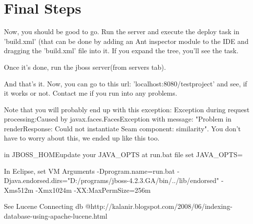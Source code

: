 \section{Final Steps}
Now, you should be good to go. Run the server and execute the deploy task in 'build.xml' (that can be done by adding an Ant inspector module to the IDE and dragging the 'build.xml' file into it. If you expand the tree, you'll see the task.

Once it's done, run the jboss server(from servers tab).

And that's it. Now, you can go to this url: 'localhost:8080/testproject' and see, if it works or not. Contact me if you run into any problems.

Note that you will probably end up with this exception: Exception during request processing:Caused by javax.faces.FacesException with message: "Problem in renderResponse: Could not instantiate Seam component: similarity". You don't have to worry about this, we ended up like this too.


in JBOSS_HOME\bin update your JAVA_OPTS at run.bat file
set JAVA_OPTS=%

In Eclipse, set VM Arguments
-Dprogram.name=run.bat -Djava.endorsed.dirs="D:/programs/jboss-4.2.3.GA/bin/../lib/endorsed" -Xms512m -Xmx1024m -XX:MaxPermSize=256m

See Lucene Connecting db @http://kalanir.blogspot.com/2008/06/indexing-database-using-apache-lucene.html

